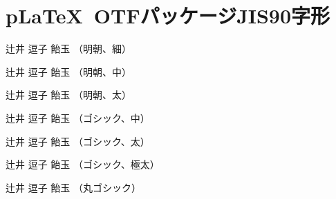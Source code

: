 \documentclass{jsarticle}
\begin{document}
\section{p\LaTeX~OTFパッケージJIS90字形}

\selectfont
辻井 逗子 飴玉 （明朝、細）

\selectfont
辻井 逗子 飴玉 （明朝、中）

\selectfont
辻井 逗子 飴玉 （明朝、太）

\selectfont
辻井 逗子 飴玉 （ゴシック、中）

\selectfont
辻井 逗子 飴玉 （ゴシック、太）

\selectfont
辻井 逗子 飴玉 （ゴシック、極太）

\selectfont
辻井 逗子 飴玉 （丸ゴシック）
\end{document}
